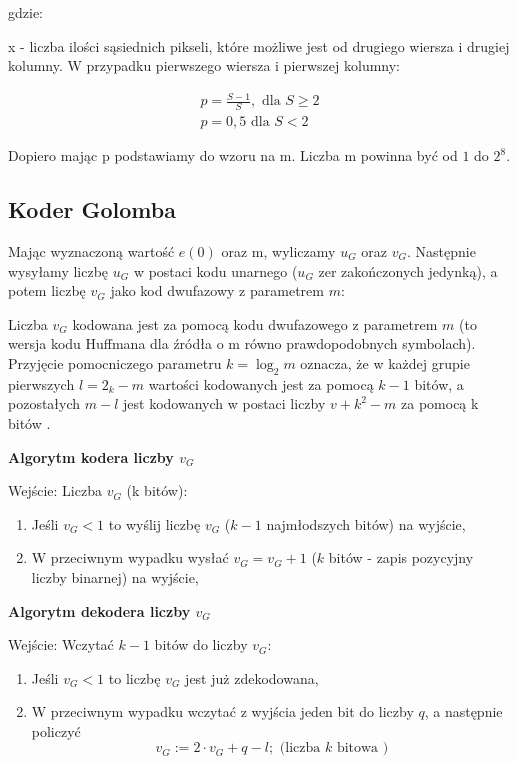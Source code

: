 \documentclass{article}
\begin{document}
gdzie:
	
x - liczba ilości sąsiednich pikseli, które możliwe jest od drugiego wiersza i drugiej kolumny. W przypadku pierwszego wiersza i pierwszej kolumny:

\begin{equation}
\begin{array}{l}
p=\frac{S-1}{S}, \text { dla } S \geq 2 \\
p=0,5 \text { dla } S<2
\end{array}
\end{equation}

Dopiero mając p podstawiamy do wzoru na m. Liczba m powinna być od $1$ do $2^8$.

\subsection{Koder Golomba}
\label{sec:golomb}

Mając wyznaczoną wartość $e(0)$ oraz m, wyliczamy $u_G$ oraz $v_G$. Następnie wysyłamy liczbę $u_G$ w postaci kodu unarnego ($u_G$ zer zakończonych jedynką), a potem liczbę $v_G$ jako kod dwufazowy z parametrem $m$:

Liczba $v_G$ kodowana jest za pomocą kodu dwufazowego z parametrem $m$ (to wersja kodu Huffmana dla źródła o m równo prawdopodobnych symbolach). Przyjęcie pomocniczego parametru $k = \log_2 m$ oznacza, że w każdej grupie pierwszych $l = 2_k - m$ wartości kodowanych jest za pomocą $k - 1$ bitów, a pozostałych $m-l$ jest kodowanych w postaci liczby $v + k^2 - m$ za pomocą k bitów \cite{golomb}.

\textbf{Algorytm kodera liczby $v_G$}

Wejście: Liczba $v_G$ (k bitów):

\begin{enumerate}
	\item Jeśli $v_G < 1$ to wyślij liczbę $v_G$ ($k-1$ najmłodszych bitów) na wyjście,
	\item W przeciwnym wypadku wysłać $v_G = v_G + 1$ ($k$ bitów - zapis pozycyjny liczby binarnej) na wyjście,
\end{enumerate}

\textbf{Algorytm dekodera liczby $v_G$}

Wejście: Wczytać $k - 1$ bitów do liczby $v_G$:

\begin{enumerate}
	\item Jeśli $v_G < 1$ to liczbę $v_G$ jest już zdekodowana,
	\item W przeciwnym wypadku wczytać z wyjścia jeden bit do liczby $q$, a następnie policzyć 
	\begin{equation}
	v_{G}:=2 \cdot v_{G}+q-l ; \text { (liczba } k \text { bitowa })
	\end{equation}
\end{enumerate}
\end{document}
